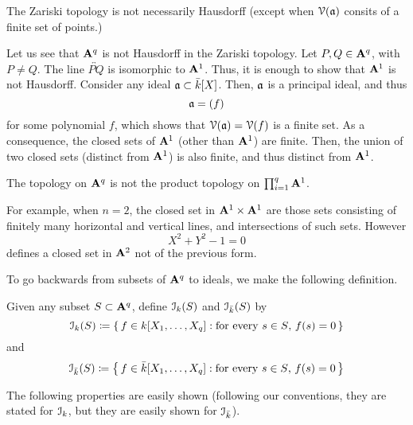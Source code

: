 The Zariski topology is not necessarily Hausdorff (except when $\mathcal{V}(\mathfrak{a})$
consits of a finite set of points.)

Let us see that $\mathbf{A}^q$ is not Hausdorff in the Zariski topology. Let
$P,Q\in\mathbf{A}^q$, with $P\neq Q$. The line $\overleftrightarrow{PQ}$ is
isomorphic to $\mathbf{A}^1$. Thus, it is enough to show that $\mathbf{A}^1$ is not
Hausdorff. Consider any ideal $\mathfrak{a}\subset\bar k[X]$. Then, $\mathfrak{a}$ is a
principal ideal, and thus
\[
\mathfrak{a}=(f)
\]
for some polynomial $f$, which shows that $\mathcal{V}(\mathfrak{a})=\mathcal{V}(f)$ is a finite
set. As a consequence, the closed sets of $\mathbf{A}^1$ (other than $\mathbf{A}^1$)
are finite. Then, the union of two closed sets (distinct from $\mathbf{A}^1$) is
also finite, and thus distinct from $\mathbf{A}^1$.

The topology on $\mathbf{A}^q$ is not the product topology on
$\prod_{i=1}^q\mathbf{A}^1$.

For example, when $n=2$, the closed set in $\mathbf{A}^1\times\mathbf{A}^1$ are those
sets consisting of finitely many horizontal and vertical lines, and
intersections of such sets. However
\[
X^2+Y^2-1=0
\]
defines a closed set in $\mathbf{A}^2$ not of the previous form.

To go backwards from subsets of $\mathbf{A}^q$ to ideals, we make the following
definition.
\begin{definition}
 Given any subset $S\subset\mathbf{A}^q$, define $\mathcal{I}_k(S)$ and $\mathcal{I}_{\bar
   k}(S)$ by
\[
\mathcal{I}_k(S)\coloneqq\left\{\,f\in k[X_1,\dotsc,X_q]:
\text{for every $s\in S$, $f(s)=0$}\,\right\}
\]
and
\[
\mathcal{I}_{\bar k}(S)\coloneqq\left\{\,f\in\bar k[X_1,\dotsc,X_q]:
\text{for every $s\in S$, $f(s)=0$}\,\right\}
\]
\end{definition}

The following properties are easily shown (following our conventions, they
are stated for $\mathcal{I}_k$, but they are easily shown for $\mathcal{I}_{\bar k}$).


